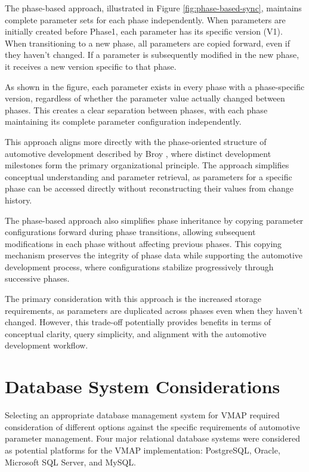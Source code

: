 The phase-based approach, illustrated in Figure \ref{fig:phase-based-sync}, maintains complete parameter sets for each phase independently. When parameters are initially created before Phase1, each parameter has its specific version (V1). When transitioning to a new phase, all parameters are copied forward, even if they haven't changed. If a parameter is subsequently modified in the new phase, it receives a new version specific to that phase.

As shown in the figure, each parameter exists in every phase with a phase-specific version, regardless of whether the parameter value actually changed between phases. This creates a clear separation between phases, with each phase maintaining its complete parameter configuration independently.

This approach aligns more directly with the phase-oriented structure of automotive development described by Broy \cite{broy2006challenges}, where distinct development milestones form the primary organizational principle. The approach simplifies conceptual understanding and parameter retrieval, as parameters for a specific phase can be accessed directly without reconstructing their values from change history.

The phase-based approach also simplifies phase inheritance by copying parameter configurations forward during phase transitions, allowing subsequent modifications in each phase without affecting previous phases. This copying mechanism preserves the integrity of phase data while supporting the automotive development process, where configurations stabilize progressively through successive phases.

The primary consideration with this approach is the increased storage requirements, as parameters are duplicated across phases even when they haven't changed. However, this trade-off potentially provides benefits in terms of conceptual clarity, query simplicity, and alignment with the automotive development workflow.

\section{Database System Considerations}
\label{sec:database-system-considerations}

Selecting an appropriate database management system for VMAP required consideration of different options against the specific requirements of automotive parameter management. Four major relational database systems were considered as potential platforms for the VMAP implementation: PostgreSQL, Oracle, Microsoft SQL Server, and MySQL.

